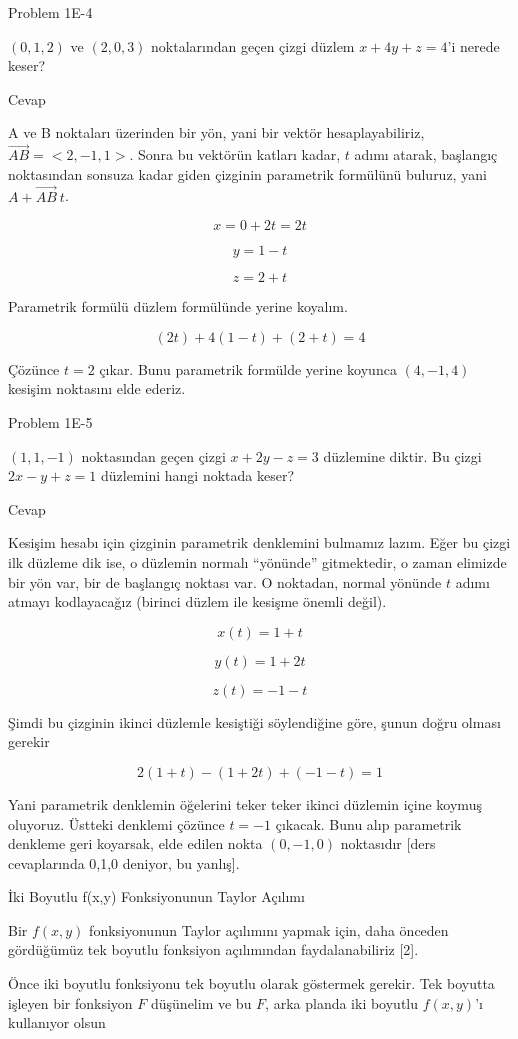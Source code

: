 \documentclass[12pt,fleqn]{article}\usepackage{../../common}
\begin{document}
Problem 1E-4

$(0,1,2)$ ve $(2,0,3)$ noktalarından geçen çizgi düzlem $x + 4y + z = 4$'i
nerede keser? 

Cevap

A ve B noktaları üzerinden bir yön, yani bir vektör hesaplayabiliriz, $\vec{AB}
= <2,-1,1>$. Sonra bu vektörün katları kadar, $t$ adımı atarak, başlangıç
noktasından sonsuza kadar giden çizginin parametrik formülünü buluruz, yani $A +
\vec{AB} \ t$.

$$ x = 0 + 2t = 2t $$

$$ y = 1 - t $$

$$ z = 2 + t $$

Parametrik formülü düzlem formülünde yerine koyalım. 

$$ (2t) + 4(1-t) + (2+t) = 4 $$

Çözünce $t=2$ çıkar. Bunu parametrik formülde yerine koyunca $(4,-1,4)$
kesişim noktasını elde ederiz. 

Problem 1E-5 

$(1,1,-1)$ noktasından geçen çizgi $x+2y - z = 3$ düzlemine diktir. Bu
çizgi $2x - y + z = 1$ düzlemini hangi noktada keser? 

Cevap

Kesişim hesabı için çizginin parametrik denklemini bulmamız lazım. Eğer bu
çizgi ilk düzleme dik ise, o düzlemin normalı ``yönünde'' gitmektedir, o
zaman elimizde bir yön var, bir de başlangıç noktası var. O noktadan,
normal yönünde $t$ adımı atmayı kodlayacağız (birinci düzlem ile kesişme
önemli değil). 

$$ x(t) = 1 + t $$

$$ y(t) = 1 + 2t $$

$$ z(t) = -1 -t $$

Şimdi bu çizginin ikinci düzlemle kesiştiği söylendiğine göre, şunun doğru
olması gerekir

$$ 2(1+t) - (1+2t) + (-1-t) = 1 $$

Yani parametrik denklemin öğelerini teker teker ikinci düzlemin içine
koymuş oluyoruz. Üstteki denklemi çözünce $t=-1$ çıkacak. Bunu alıp
parametrik denkleme geri koyarsak, elde edilen nokta $(0,-1,0)$
noktasıdır [ders cevaplarında 0,1,0 deniyor, bu yanlış]. 

İki Boyutlu f(x,y) Fonksiyonunun Taylor Açılımı

Bir $f(x,y)$ fonksiyonunun Taylor açılımını yapmak için, daha önceden
gördüğümüz tek boyutlu fonksiyon açılımından faydalanabiliriz [2]. 

Önce iki boyutlu fonksiyonu tek boyutlu olarak göstermek gerekir. Tek
boyutta işleyen bir fonksiyon $F$ düşünelim ve bu $F$, arka planda iki
boyutlu $f(x,y)$'ı kullanıyor olsun
\end{document}
